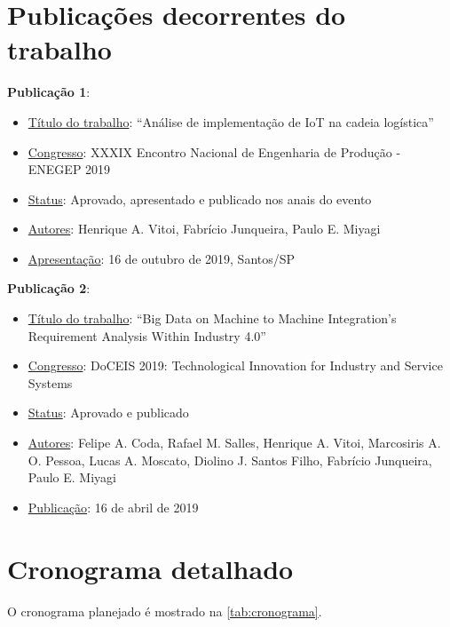 \chapter{Publicações decorrentes do trabalho}

	\textbf{Publicação 1}:
	\begin{itemize}
		\item \underline{Título do trabalho}: “Análise de implementação de IoT na cadeia logística”
		\item \underline{Congresso}: XXXIX Encontro Nacional de Engenharia de Produção - ENEGEP 2019
		\item \underline{Status}: Aprovado, apresentado e publicado nos anais do evento
		\item \underline{Autores}:  Henrique A. Vitoi, Fabrício Junqueira, Paulo E. Miyagi
		\item \underline{Apresentação}: 16 de outubro de 2019, Santos/SP
	\end{itemize}
	
	\bigskip

	\textbf{Publicação 2}:
	\begin{itemize}
		\item \underline{Título do trabalho}: “Big Data on Machine to Machine Integration's Requirement Analysis Within Industry 4.0”
		\item \underline{Congresso}: DoCEIS 2019: Technological Innovation for Industry and Service Systems
		\item \underline{Status}: Aprovado e publicado
		\item \underline{Autores}:  Felipe A. Coda, Rafael M. Salles, Henrique A. Vitoi, Marcosiris A. O. Pessoa, Lucas A. Moscato, Diolino J. Santos Filho, Fabrício Junqueira, Paulo E. Miyagi
		\item \underline{Publicação}: 16 de abril de 2019
	\end{itemize}


\chapter{Cronograma detalhado}

	O cronograma planejado é mostrado na \autoref{tab:cronograma}.
	
